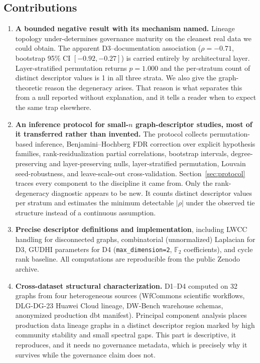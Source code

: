 \documentclass[11pt,a4paper]{article}
\begin{document}
\subsection{Contributions}

\begin{enumerate}
  \item \textbf{A bounded negative result with its mechanism named.}
        Lineage topology under-determines governance maturity on the
        cleanest real data we could obtain. The apparent D3--documentation
        association ($\rho = -0.71$, bootstrap 95\% CI $[-0.92, -0.27]$)
        is carried entirely by architectural layer. Layer-stratified
        permutation returns $p = 1.000$ and the per-stratum count of
        distinct descriptor values is 1 in all three strata. We also give
        the graph-theoretic reason the degeneracy arises. That reason is
        what separates this from a null reported without explanation, and
        it tells a reader when to expect the same trap elsewhere.

  \item \textbf{An inference protocol for small-$n$ graph-descriptor
        studies, most of it transferred rather than invented.} The
        protocol collects permutation-based inference,
        Benjamini--Hochberg FDR correction over explicit hypothesis
        families, rank-residualization partial correlations, bootstrap
        intervals, degree-preserving and layer-preserving nulls,
        layer-stratified permutation, Louvain seed-robustness, and
        leave-scale-out cross-validation. Section~\ref{sec:protocol}
        traces every component to the discipline it came from. Only the rank-degeneracy diagnostic
        appears to be new. It counts distinct descriptor values per
        stratum and estimates the minimum detectable $|\rho|$ under the
        observed tie structure instead of a continuous assumption.

  \item \textbf{Precise descriptor definitions and implementation},
        including LWCC handling for disconnected graphs, combinatorial
        (unnormalized) Laplacian for D3, GUDHI parameters for D4
        (\texttt{max\_dimension=2}, $\mathbb{F}_2$ coefficients), and
        cycle rank baseline. All computations are reproducible from the
        public Zenodo archive.

  \item \textbf{Cross-dataset structural characterization.} D1--D4
        computed on 32 graphs from four heterogeneous sources (WfCommons
        scientific workflows, DLG-DG-23 Huawei Cloud lineage, DW-Bench
        warehouse schemas, anonymized production dbt manifest).
        Principal component analysis places production data lineage
        graphs in a distinct descriptor region marked by high community
        stability and small spectral gaps. This part is descriptive, it
        reproduces, and it needs no governance metadata, which is
        precisely why it survives while the governance claim does not.


\end{enumerate}
\end{document}
